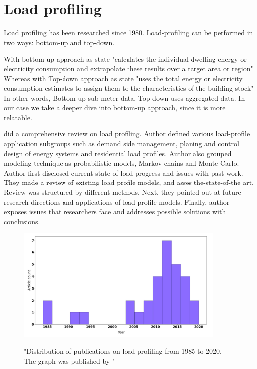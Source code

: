 \documentclass[
11pt, %
english, %
singlespacing, %
headsepline, %
]{MastersDoctoralThesis} %
\begin{document}
\section{Load profiling}

Load profiling has been researched since 1980. Load-profiling can be performed in two ways: bottom-up and top-down. 

With bottom-up approach as \cite{SWAN20091819} state "calculates the individual dwelling energy or electricity consumption and extrapolate these results over a target area or region"
Whereas with Top-down approach as \cite{SWAN20091819} state "uses the total energy or electricity consumption estimates to assign them to the characteristics of the building stock"
In other words, Bottom-up sub-meter data, Top-down uses aggregated data. In our case we take a deeper dive into bottom-up approach, since it is more relatable.

\cite{Review2021} did a comprehensive review on load profiling. Author defined various load-profile application
subgroups such as demand side management, planing and control design of energy systems and residential load profiles. Author also 
grouped modeling technique as probabilistic models, Markov chains and Monte Carlo. Author first disclosed current state of load progress and issues with past work. They made a review of existing load profile models,
and asses the-state-of-the art. Review was structured by different methods. Next, they pointed out at future research directions
and applications of load profile models. Finally, author exposes issues that researchers face and addresses possible solutions with conclusions.

\begin{figure}[h!]
	\centering
	\caption{"Distribution of publications on load profiling from 1985 to 2020. The graph was published by \protect\cite{Review2021}"}
	\includegraphics[width=0.9\textwidth]{Figures/publications.png}
	\label{fig:Distribution}
\end{figure}
\end{document}
